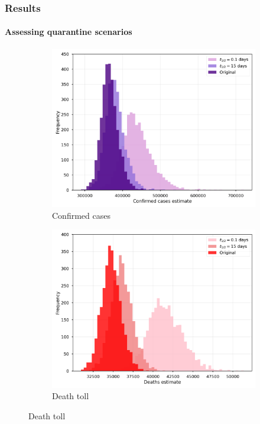 \documentclass{beamer}
\begin{document}
\begin{frame}
\frametitle{Results} 
\framesubtitle{Assessing quarantine scenarios} 

	\begin{figure}
		\centering
		\caption*{When disease spreading ends...}
		\begin{subfigure}[t]{0.49\textwidth}
			\centering
			\includegraphics[width=\textwidth]{figs/model_prediction_confirmed.png}
			\caption*{Confirmed cases}
		\end{subfigure}
		\hfill
		\begin{subfigure}[t]{0.49\textwidth}
			\centering
			\includegraphics[width=\textwidth]{figs/model_prediction_dead.png}
			\caption*{Death toll}
		\end{subfigure}
	\end{figure}

\end{frame}
\end{document}
